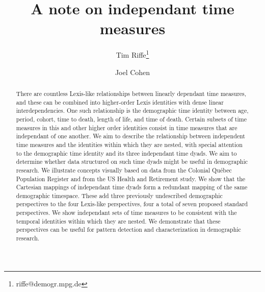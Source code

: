 


\title{A note on independant time measures}

\author[1]{Tim Riffe\thanks{riffe@demogr.mpg.de}}
\author[2]{Joel Cohen}





\maketitle

\vspace{-2em}
\begin{abstract}
 There are countless Lexis-like relationships between
linearly dependant time measures, and these can be combined into higher-order
Lexis identities with dense linear interdependencies. One such relationship is
the demographic time identity between age, period, cohort, time to death, length of life, and time of death. Certain subsets of time measures in this
and other higher order identities consist in time measures that are independant
of one another.
 We aim to describe the relationship between
independent time measures and the identities within which they are nested, with
special attention to the demographic time identity and its three independant
time dyads. We aim to determine whether data structured on such time dyads might
be useful in demographic research.
 We illustrate concepts visually based on data from the
Colonial Qu\'{e}bec Population Register and from the US Health and Retirement study.
  We show that the Cartesian mappings of independant time dyads form a redundant mapping of the same demographic timespace. These add three previously undescribed demographic perspectives to the four Lexis-like perspectives, four a total of seven proposed standard perspectives. 
 We show independant sets of time measures to be consistent with the temporal identities within which they are nested. We demonstrate that these perspectives can be useful for pattern detection and characterization in demographic research.
\end{abstract}

